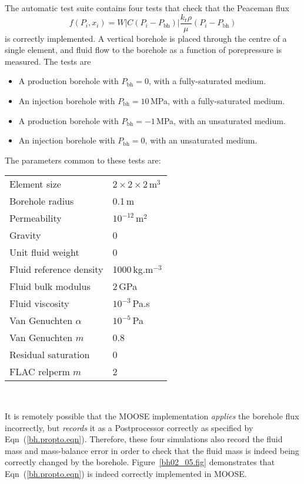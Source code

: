 The automatic test suite contains four tests that check that the Peaceman flux
\begin{equation}
f(P_{i}, x_{i}) =
W \left|C(P_{i}-P_{\mathrm{bh}})\right|
\frac{k_{\mathrm{r}}\rho}{\mu}(P_{i} - P_{\mathrm{bh}})
\label{bh.propto.eqn}
\end{equation}
is correctly implemented.  A vertical borehole is placed through the
centre of a single element, and fluid flow to the borehole as a
function of porepressure is measured.  The tests are
\begin{itemize}
\item A production borehole with $P_{\mathrm{bh}} = 0$, with a
  fully-saturated medium.
\item An injection borehole with $P_{\mathrm{bh}} = 10$\,MPa, with a
  fully-saturated medium.
\item A production borehole with $P_{\mathrm{bh}} = -1$\,MPa, with an
  unsaturated medium.
\item An injection borehole with $P_{\mathrm{bh}} = 0$, with an
  unsaturated medium.
\end{itemize}
The parameters common to these tests are:
\begin{center}
\begin{tabular}{|ll|}
\hline
Element size & $2\times 2\times 2$\,m$^{3}$ \\
Borehole radius & 0.1\,m \\
Permeability & $10^{-12}$\,m$^{2}$ \\
Gravity & 0 \\
Unit fluid weight & 0 \\
Fluid reference density & 1000\,kg.m$^{-3}$ \\
Fluid bulk modulus & 2\,GPa \\
Fluid viscosity & $10^{-3}$\,Pa.s \\
Van Genuchten $\alpha$ & $10^{-5}$\,Pa \\
Van Genuchten $m$ & 0.8  \\
Residual saturation & 0 \\
FLAC relperm $m$ & 2 \\
\hline
\end{tabular} \\
\end{center}
It is remotely possible that the MOOSE implementation {\em applies}
the borehole flux incorrectly, but {\em records} it as a Postprocessor
correctly as specified by Eqn~(\ref{bh.propto.eqn}).  Therefore, these
four simulations also record the fluid mass and mass-balance error in
order to check that the fluid mass is indeed being correctly changed
by the borehole.  Figure~\ref{bh02_05.fig} demonstrates that
Eqn~(\ref{bh.propto.eqn}) is indeed correctly implemented in MOOSE.

